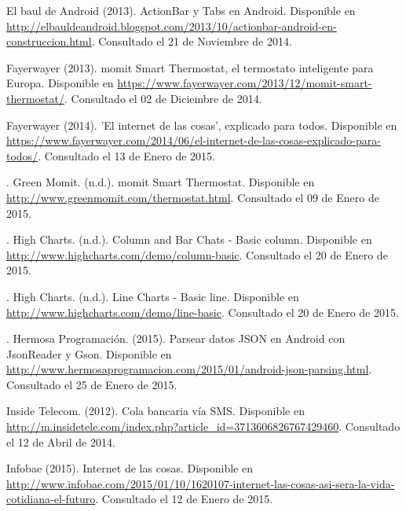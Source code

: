 \begin{spacing}{1.0}
\begin{thebibliography}{99}

\newblock El baul de Android (2013).
\newblock ActionBar y Tabs en Android.
\newblock Disponible en \url{http://elbauldeandroid.blogspot.com/2013/10/actionbar-android-en-construccion.html}.
\newblock Consultado el 21 de Noviembre de 2014.



\newblock Fayerwayer (2013).
\newblock momit Smart Thermostat, el termostato inteligente para Europa.
\newblock Disponible en \url{https://www.fayerwayer.com/2013/12/momit-smart-thermostat/}.
\newblock Consultado el 02 de Diciembre de 2014.

\newblock Fayerwayer (2014).
\newblock 'El internet de las cosas', explicado para todos.
\newblock Disponible en \url{https://www.fayerwayer.com/2014/06/el-internet-de-las-cosas-explicado-para-todos/}.
\newblock Consultado el 13 de Enero de 2015.


.
\newblock Green Momit. (n.d.).
\newblock momit Smart Thermostat.
\newblock Disponible en \url{http://www.greenmomit.com/thermostat.html}.
\newblock Consultado el 09 de Enero de 2015.


.
\newblock High Charts. (n.d.).
\newblock Column and Bar Chats - Basic column.
\newblock Disponible en \url{http://www.highcharts.com/demo/column-basic}.
\newblock Consultado el 20 de Enero de 2015.

.
\newblock High Charts. (n.d.).
\newblock Line Charts - Basic line.
\newblock Disponible en \url{http://www.highcharts.com/demo/line-basic}.
\newblock Consultado el 20 de Enero de 2015.

.
\newblock Hermosa Programación. (2015).
\newblock Parsear datos JSON en Android con JsonReader y Gson.
\newblock Disponible en \url{http://www.hermosaprogramacion.com/2015/01/android-json-parsing.html}.
\newblock Consultado el 25 de Enero de 2015.


\newblock Inside Telecom. (2012).
\newblock Cola bancaria vía SMS.
\newblock Disponible en \url{http://m.insidetele.com/index.php?article_id=3713606826767429460}.
\newblock Consultado el 12 de Abril de 2014.

\newblock Infobae (2015).
\newblock Internet de las cosas.
\newblock Disponible en \url{http://www.infobae.com/2015/01/10/1620107-internet-las-cosas-asi-sera-la-vida-cotidiana-el-futuro}.
\newblock Consultado el 12 de Enero de 2015.


\end{thebibliography}
\end{spacing}

